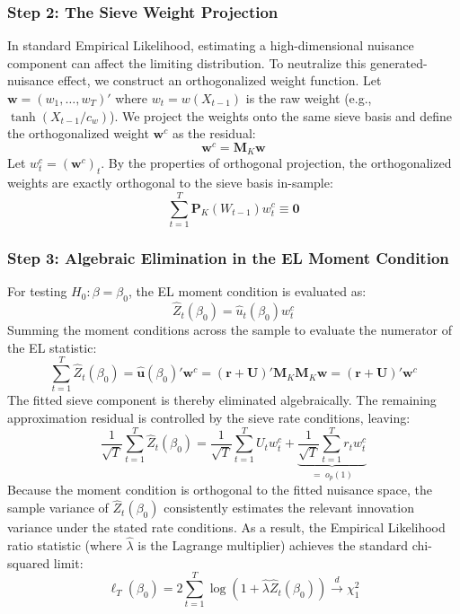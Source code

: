 \documentclass{article}
\begin{document}
\subsubsection*{Step 2: The Sieve Weight Projection}
In standard Empirical Likelihood, estimating a high-dimensional nuisance component can affect the limiting distribution. To neutralize this generated-nuisance effect, we construct an orthogonalized weight function. Let $\bm{w} = (w_1, \dots, w_T)'$ where $w_t = w(X_{t-1})$ is the raw weight (e.g., $\tanh(X_{t-1}/c_w)$). We project the weights onto the same sieve basis and define the orthogonalized weight $\bm{w}^c$ as the residual:
\begin{equation}
    \bm{w}^c = \bm{M}_K \bm{w}
\end{equation}
Let $w_t^c = (\bm{w}^c)_t$. By the properties of orthogonal projection, the orthogonalized weights are exactly orthogonal to the sieve basis in-sample:
\begin{equation}
    \sum_{t=1}^T \bm{P}_K(W_{t-1}) w_t^c \equiv \bm{0}
\end{equation}

\subsubsection*{Step 3: Algebraic Elimination in the EL Moment Condition}
For testing $H_0: \beta = \beta_0$, the EL moment condition is evaluated as:
\begin{equation}
    \widehat{Z}_t(\beta_0) = \widehat{u}_t(\beta_0) w_t^c
\end{equation}
Summing the moment conditions across the sample to evaluate the numerator of the EL statistic:
\begin{equation}
    \sum_{t=1}^T \widehat{Z}_t(\beta_0) = \widehat{\bm{u}}(\beta_0)' \bm{w}^c = (\bm{r} + \bm{U})' \bm{M}_K \bm{M}_K \bm{w} = (\bm{r} + \bm{U})' \bm{w}^c
\end{equation}
The fitted sieve component is thereby eliminated algebraically. The remaining approximation residual is controlled by the sieve rate conditions, leaving:
\begin{equation}
    \frac{1}{\sqrt{T}} \sum_{t=1}^T \widehat{Z}_t(\beta_0) = \frac{1}{\sqrt{T}} \sum_{t=1}^T U_t w_t^c + \underbrace{\frac{1}{\sqrt{T}} \sum_{t=1}^T r_t w_t^c}_{=\; o_p(1)}
\end{equation}
Because the moment condition is orthogonal to the fitted nuisance space, the sample variance of $\widehat{Z}_t(\beta_0)$ consistently estimates the relevant innovation variance under the stated rate conditions. As a result, the Empirical Likelihood ratio statistic (where $\widehat{\lambda}$ is the Lagrange multiplier) achieves the standard chi-squared limit:
\begin{equation}
    \ell_T(\beta_0) = 2 \sum_{t=1}^T \log(1 + \widehat{\lambda} \widehat{Z}_t(\beta_0)) \xrightarrow{d} \chi^2_1
\end{equation}
\end{document}
